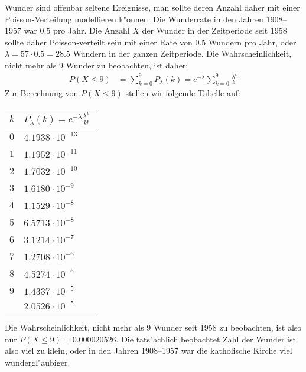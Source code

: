\begin{loesung}
Wunder sind offenbar seltene Ereignisse, man sollte deren Anzahl daher
mit einer Poisson-Verteilung modellieren k"onnen. Die Wunderrate in den
Jahren 1908--1957 war $0.5$ pro Jahr.
Die Anzahl $X$ der Wunder in der Zeitperiode
seit 1958 sollte daher Poisson-verteilt sein mit einer Rate von $0.5$ 
Wundern pro Jahr, oder $\lambda=57\cdot0.5 =28.5$ Wundern in der
ganzen Zeitperiode.
Die Wahrscheinlichkeit, nicht mehr als $9$ Wunder zu beobachten,
ist daher:
\begin{align*}
P(X\le 9)
&=
\sum_{k=0}^9 P_\lambda(k)=e^{-\lambda}\sum_{k=0}^9 \frac{\lambda^k}{k!}
\end{align*}
Zur Berechnung von $P(X\le 9)$ stellen wir folgende Tabelle auf:
\begin{center}
\begin{tabular}{|l|l|}
\hline
$k$&$P_\lambda(k)=e^{-\lambda}\frac{\lambda^k}{k!}$\\
\hline
  0&$4.1938\cdot 10^{-13}$\\
  1&$1.1952\cdot 10^{-11}$\\
  2&$1.7032\cdot 10^{-10}$\\
  3&$1.6180\cdot 10^{-9}$\\
  4&$1.1529\cdot 10^{-8}$\\
  5&$6.5713\cdot 10^{-8}$\\
  6&$3.1214\cdot 10^{-7}$\\
  7&$1.2708\cdot 10^{-6}$\\
  8&$4.5274\cdot 10^{-6}$\\
  9&$1.4337\cdot 10^{-5}$\\
\hline
   &$2.0526\cdot 10^{-5}$\\
\hline
\end{tabular}
\end{center}
Die Wahrscheinlichkeit, nicht mehr als 9 Wunder seit 1958 zu beobachten,
ist also nur $P(X\le 9)=0.000020526$.
Die tats"achlich beobachtet Zahl der Wunder ist also viel zu klein,
oder in den Jahren 1908--1957 war die katholische Kirche viel wundergl"aubiger.
\end{loesung}

